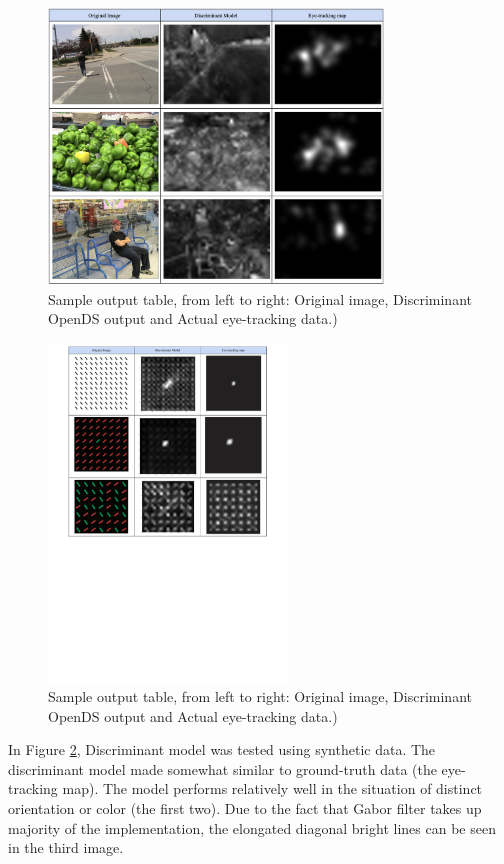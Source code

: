 \documentclass[conference]{IEEEtran}
\begin{document}
\begin{figure}[h]
    \centering
    \includegraphics[width=3.5in]{outputs.png}
    \caption{Sample output table, from left to right: Original image, Discriminant OpenDS output and Actual eye-tracking data.) }
    \label{fig:outputs1}
\end{figure}

\begin{figure}[h]
    \centering
    \includegraphics[trim={180 500 180 20},width=2.5in]{outputs2.pdf}
    \caption{Sample output table, from left to right: Original image, Discriminant OpenDS output and Actual eye-tracking data.) }
    \label{fig:outputs2}
\end{figure}

In Figure \ref{fig:outputs2}, Discriminant model was tested using synthetic data. The discriminant model made somewhat similar to ground-truth data (the eye-tracking map). The model performs relatively well in the situation of distinct orientation or color (the first two). Due to the fact that Gabor filter takes up majority of the implementation, the elongated diagonal bright lines can be seen in the third image. 
\end{document}

